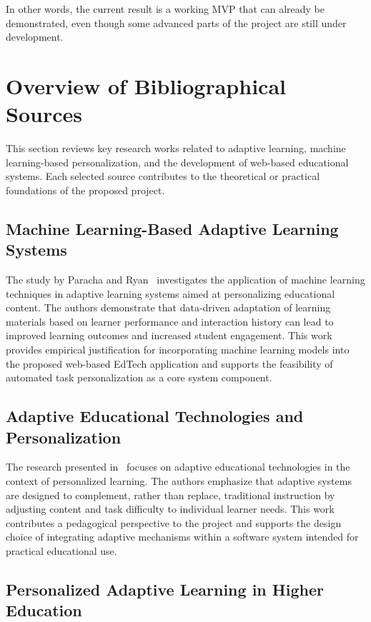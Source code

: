 \documentclass[a4paper,12pt]{extarticle}
\begin{document}
In other words, the current result is a working MVP that can already be demonstrated, even though some advanced parts of the project are still under development.


\section{Overview of Bibliographical Sources}

This section reviews key research works related to adaptive learning, machine learning-based personalization, and the development of web-based educational systems. Each selected source contributes to the theoretical or practical foundations of the proposed project.

\subsection{Machine Learning-Based Adaptive Learning Systems}

The study by Paracha and Ryan~\cite{adaptiveML2025} investigates the application of machine learning techniques in adaptive learning systems aimed at personalizing educational content. The authors demonstrate that data-driven adaptation of learning materials based on learner performance and interaction history can lead to improved learning outcomes and increased student engagement. This work provides empirical justification for incorporating machine learning models into the proposed web-based EdTech application and supports the feasibility of automated task personalization as a core system component.

\subsection{Adaptive Educational Technologies and Personalization}

The research presented in~\cite{adaptiveEdu2025} focuses on adaptive educational technologies in the context of personalized learning. The authors emphasize that adaptive systems are designed to complement, rather than replace, traditional instruction by adjusting content and task difficulty to individual learner needs. This work contributes a pedagogical perspective to the project and supports the design choice of integrating adaptive mechanisms within a software system intended for practical educational use.

\subsection{Personalized Adaptive Learning in Higher Education}
\end{document}
